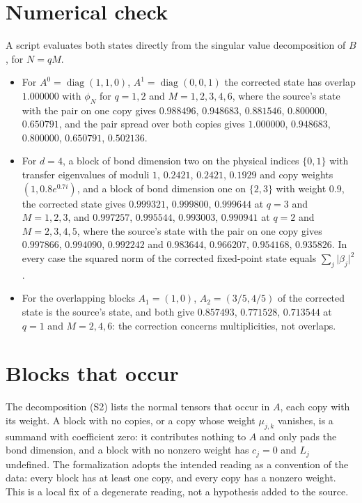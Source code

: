 \documentclass{article}
\begin{document}
\section{Numerical check}
A script evaluates both states directly from the singular value decomposition of
$B$, for $N=qM$.
\begin{itemize}
    \item For $A^0=\operatorname{diag}(1,1,0)$, $A^1=\operatorname{diag}(0,0,1)$ the
          corrected state has overlap $1.000000$ with $\phi_N$ for $q=1,2$ and
          $M=1,2,3,4,6$, where the source's state with the pair on one copy gives
          $0.988496$, $0.948683$, $0.881546$, $0.800000$, $0.650791$, and the pair
          spread over both copies gives $1.000000$, $0.948683$, $0.800000$,
          $0.650791$, $0.502136$.
    \item For $d=4$, a block of bond dimension two on the physical indices
          $\{0,1\}$ with transfer eigenvalues of moduli $1$, $0.2421$, $0.2421$,
          $0.1929$ and copy weights $(1,0.8e^{0.7i})$, and a block of bond
          dimension one on $\{2,3\}$ with weight $0.9$, the corrected state gives
          $0.999321$, $0.999800$, $0.999644$ at $q=3$ and $M=1,2,3$, and
          $0.997257$, $0.995544$, $0.993003$, $0.990941$ at $q=2$ and $M=2,3,4,5$,
          where the source's state with the pair on one copy gives $0.997866$,
          $0.994090$, $0.992242$ and $0.983644$, $0.966207$, $0.954168$,
          $0.935826$. In every case the squared norm of the corrected fixed-point
          state equals $\sum_j\lvert\beta_j\rvert^2$.
    \item For the overlapping blocks $A_1=(1,0)$, $A_2=(3/5,4/5)$ of
          \cite{gap:mswc24_block_form_mixed_overlap} the corrected state is the
          source's state, and both give $0.857493$, $0.771528$, $0.713544$ at $q=1$
          and $M=2,4,6$: the correction concerns multiplicities, not overlaps.
\end{itemize}

\section{Blocks that occur}
The decomposition (S2) lists the normal tensors that occur in $A$, each copy
with its weight. A block with no copies, or a copy whose weight $\mu_{j,k}$
vanishes, is a summand with coefficient zero: it contributes nothing to $A$ and
only pads the bond dimension, and a block with no nonzero weight has $c_j=0$ and
$L_j$ undefined. The formalization adopts the intended reading as a convention of
the data: every block has at least one copy, and every copy has a nonzero
weight. This is a local fix of a degenerate reading, not a hypothesis added to
the source.
\end{document}
